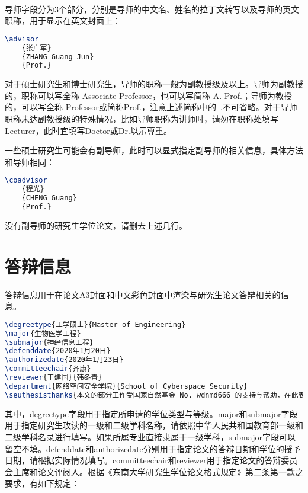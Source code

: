 ~

导师字段分为3个部分，分别是导师的中文名、姓名的拉丁文转写以及导师的英文职称，用于显示在英文封面上：

\begin{tcolorbox}
\begin{lstlisting}[language=TeX]
\advisor
    {张广军}
    {ZHANG Guang-Jun}
    {Prof.}
\end{lstlisting}
\end{tcolorbox}

\noindent 对于硕士研究生和博士研究生，导师的职称一般为副教授级及以上。导师为副教授的，职称可以写全称 Associate Professor，也可以写简称 A. Prof.；导师为教授的，可以写全称 Professor或简称Prof.，注意上述简称中的~.不可省略。对于导师职称未达副教授级的特殊情况，比如导师职称为讲师时，请勿在职称处填写Lecturer，此时宜填写Doctor或Dr.以示尊重。

一些硕士研究生可能会有副导师，此时可以显式指定副导师的相关信息，具体方法和导师相同：

\begin{tcolorbox}
\begin{lstlisting}[language=TeX]
\coadvisor
    {程光}
    {CHENG Guang}
    {Prof.}
\end{lstlisting}
\end{tcolorbox}

\noindent 没有副导师的研究生学位论文，请删去上述几行。

\section{答辩信息}

答辩信息用于在论文A3封面和中文彩色封面中渲染与研究生论文答辩相关的信息。

\begin{tcolorbox}
\begin{lstlisting}[language=TeX]
\degreetype{工学硕士}{Master of Engineering}
\major{生物医学工程}
\submajor{神经信息工程}
\defenddate{2020年1月20日}
\authorizedate{2020年1月23日}
\committeechair{齐康}
\reviewer{王建国}{韩冬青}
\department{网络空间安全学院}{School of Cyberspace Security}
\seuthesisthanks{本文的部分工作受国家自然基金 No. wdnmd666 的支持与帮助，在此表示感谢。}
\end{lstlisting}
\end{tcolorbox}

其中，{\codefont degreetype}字段用于指定所申请的学位类型与等级。{\codefont major}和{\codefont submajor}字段用于指定研究生攻读的一级和二级学科名称，请依照中华人民共和国教育部一级和二级学科名录进行填写。如果所属专业直接隶属于一级学科，{\codefont submajor}字段可以留空不填。{\codefont defenddate}和{\codefont authorizedate}分别用于指定论文的答辩日期和学位的授予日期，请根据实际情况填写。{\codefont committeechair}和{\codefont reviewer}用于指定论文的答辩委员会主席和论文评阅人。根据《东南大学研究生学位论文格式规定》\cite{seugs2023rule}第二条第一款之要求，有如下规定：

